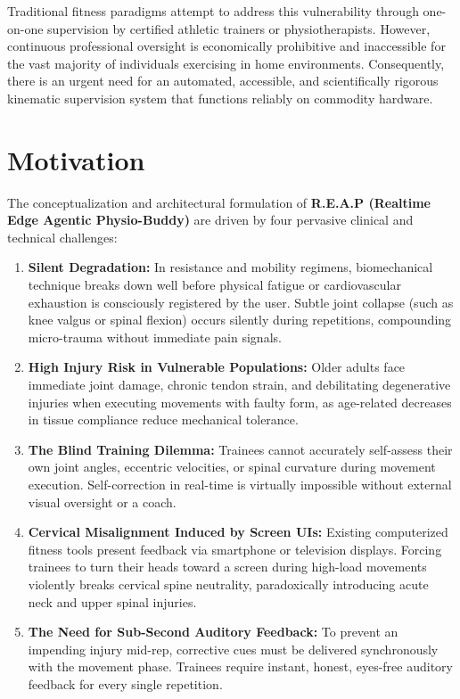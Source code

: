 \documentclass[12pt,a4paper]{report}
\begin{document}
Traditional fitness paradigms attempt to address this vulnerability through one-on-one supervision by certified athletic trainers or physiotherapists. However, continuous professional oversight is economically prohibitive and inaccessible for the vast majority of individuals exercising in home environments. Consequently, there is an urgent need for an automated, accessible, and scientifically rigorous kinematic supervision system that functions reliably on commodity hardware.

\section{Motivation}
The conceptualization and architectural formulation of \textbf{R.E.A.P (Realtime Edge Agentic Physio-Buddy)} are driven by four pervasive clinical and technical challenges:

\begin{enumerate}[label=\textbf{(\arabic*)}]
    \item \textbf{Silent Degradation:} In resistance and mobility regimens, biomechanical technique breaks down well before physical fatigue or cardiovascular exhaustion is consciously registered by the user. Subtle joint collapse (such as knee valgus or spinal flexion) occurs silently during repetitions, compounding micro-trauma without immediate pain signals.
    \item \textbf{High Injury Risk in Vulnerable Populations:} Older adults face immediate joint damage, chronic tendon strain, and debilitating degenerative injuries when executing movements with faulty form, as age-related decreases in tissue compliance reduce mechanical tolerance.
    \item \textbf{The Blind Training Dilemma:} Trainees cannot accurately self-assess their own joint angles, eccentric velocities, or spinal curvature during movement execution. Self-correction in real-time is virtually impossible without external visual oversight or a coach.
    \item \textbf{Cervical Misalignment Induced by Screen UIs:} Existing computerized fitness tools present feedback via smartphone or television displays. Forcing trainees to turn their heads toward a screen during high-load movements violently breaks cervical spine neutrality, paradoxically introducing acute neck and upper spinal injuries.
    \item \textbf{The Need for Sub-Second Auditory Feedback:} To prevent an impending injury mid-rep, corrective cues must be delivered synchronously with the movement phase. Trainees require instant, honest, eyes-free auditory feedback for every single repetition.
\end{enumerate}
\end{document}
